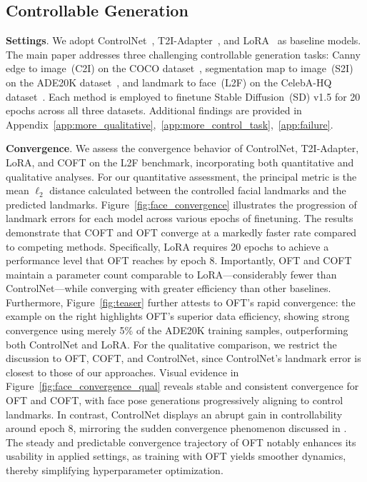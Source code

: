 {\subsection{Controllable Generation}

\textbf{Settings}. We adopt ControlNet~\cite{zhang2023adding}, T2I-Adapter~\cite{mou2023t2i}, and LoRA~\cite{hulora2022} as baseline models. The main paper addresses three challenging controllable generation tasks: Canny edge to image~(C2I) on the COCO dataset~\cite{lin2014microsoft}, segmentation map to image~(S2I) on the ADE20K dataset~\cite{zhou2017scene}, and landmark to face~(L2F) on the CelebA-HQ dataset~\cite{karras2018progressive,xia2021tedigan}. Each method is employed to finetune Stable Diffusion~(SD) v1.5 for 20 epochs across all three datasets. Additional findings are provided in Appendix~\ref{app:more_qualitative},~\ref{app:more_control_task},~\ref{app:failure}.

\textbf{Convergence}. We assess the convergence behavior of ControlNet, T2I-Adapter, LoRA, and COFT on the L2F benchmark, incorporating both quantitative and qualitative analyses. For our quantitative assessment, the principal metric is the mean $\ell_2$ distance calculated between the controlled facial landmarks and the predicted landmarks. Figure~\ref{fig:face_convergence} illustrates the progression of landmark errors for each model across various epochs of finetuning. The results demonstrate that COFT and OFT converge at a markedly faster rate compared to competing methods. Specifically, LoRA requires 20 epochs to achieve a performance level that OFT reaches by epoch 8. Importantly, OFT and COFT maintain a parameter count comparable to LoRA—considerably fewer than ControlNet—while converging with greater efficiency than other baselines. Furthermore, Figure~\ref{fig:teaser} further attests to OFT’s rapid convergence: the example on the right highlights OFT’s superior data efficiency, showing strong convergence using merely 5\% of the ADE20K training samples, outperforming both ControlNet and LoRA. For the qualitative comparison, we restrict the discussion to OFT, COFT, and ControlNet, since ControlNet's landmark error is closest to those of our approaches. Visual evidence in Figure~\ref{fig:face_convergence_qual} reveals stable and consistent convergence for OFT and COFT, with face pose generations progressively aligning to control landmarks. In contrast, ControlNet displays an abrupt gain in controllability around epoch 8, mirroring the sudden convergence phenomenon discussed in \cite{zhang2023adding}. The steady and predictable convergence trajectory of OFT notably enhances its usability in applied settings, as training with OFT yields smoother dynamics, thereby simplifying hyperparameter optimization.

}
